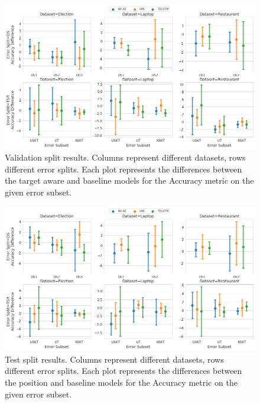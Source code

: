 \begin{figure}[!h]
    \centering
    \includegraphics[scale=0.3]{images/augmentation/methods_performance/Inter_Target/inter_target_encoding_split_overall_diff_validation.png}
    \caption{Validation split results. Columns represent different datasets, rows different error splits. Each plot represents the differences between the target aware and baseline models for the Accuracy metric on the given error subset.}
    \label{fig:aug_inter_target_encoding_split_overall_diff_validation}
\end{figure}

\begin{figure}[!h]
    \centering
    \includegraphics[scale=0.3]{images/augmentation/methods_performance/Inter_Target/inter_target_encoding_split_overall_diff_test.png}
    \caption{Test split results. Columns represent different datasets, rows different error splits. Each plot represents the differences between the position and baseline models for the Accuracy metric on the given error subset.}
    \label{fig:aug_inter_target_encoding_split_overall_diff_test}
\end{figure}